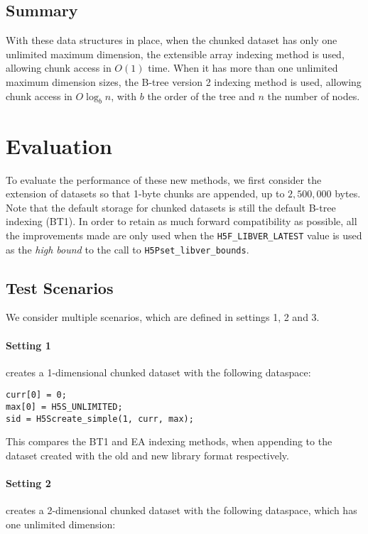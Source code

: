 \subsection{Summary}

With these data structures in place, when the chunked dataset has only one
unlimited maximum dimension, the extensible array indexing method is used,
allowing chunk access in $O(1)$ time. When it has more than one unlimited
maximum dimension sizes, the B-tree version 2 indexing method is used, allowing
chunk access in $O\log_b{n}$, with $b$ the order of the tree and $n$ the
number of nodes.

\section{Evaluation}
\label{sec:evaluation}

To evaluate the performance of these new methods, we first consider the extension
of datasets so that 1-byte chunks are appended, up to $2,500,000$ bytes.
Note that the default storage for chunked datasets is still the default
B-tree indexing (BT1). In order to retain as much forward compatibility as
possible, all the improvements made are only used when the
\texttt{H5F\_LIBVER\_LATEST} value is used as the \textit{high bound} to the
call to \texttt{H5Pset\_libver\_bounds}. 

\subsection{Test Scenarios}

We consider multiple scenarios, which are defined in settings 1, 2 and 3.

\paragraph{Setting 1}
creates a 1-dimensional chunked dataset with the following dataspace:

{
\begin{lstlisting}
curr[0] = 0;
max[0] = H5S_UNLIMITED;
sid = H5Screate_simple(1, curr, max);
\end{lstlisting}
}

This compares the BT1 and EA indexing methods, when appending to the dataset
created with the old and new library format respectively.

\paragraph{Setting 2} creates a 2-dimensional chunked dataset with the following
dataspace, which has one unlimited dimension:

